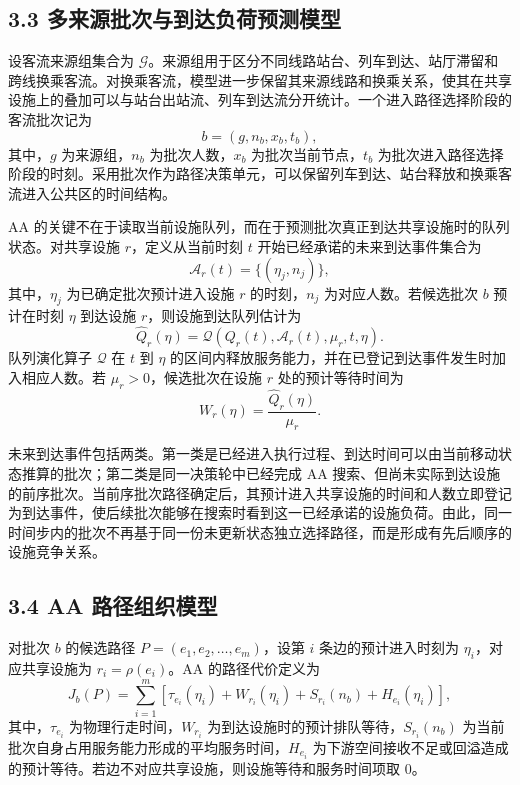 \documentclass[UTF8,a4paper,12pt]{ctexart}
\begin{document}
\subsection{3.3 多来源批次与到达负荷预测模型}

设客流来源组集合为 \(\mathcal{G}\)。来源组用于区分不同线路站台、列车到达、站厅滞留和跨线换乘客流。对换乘客流，模型进一步保留其来源线路和换乘关系，使其在共享设施上的叠加可以与站台出站流、列车到达流分开统计。一个进入路径选择阶段的客流批次记为
\[
b=(g,n_b,x_b,t_b),
\]
其中，\(g\) 为来源组，\(n_b\) 为批次人数，\(x_b\) 为批次当前节点，\(t_b\) 为批次进入路径选择阶段的时刻。采用批次作为路径决策单元，可以保留列车到达、站台释放和换乘客流进入公共区的时间结构。

AA 的关键不在于读取当前设施队列，而在于预测批次真正到达共享设施时的队列状态。对共享设施 \(r\)，定义从当前时刻 \(t\) 开始已经承诺的未来到达事件集合为
\[
\mathcal{A}_r(t)=\{(\eta_j,n_j)\},
\]
其中，\(\eta_j\) 为已确定批次预计进入设施 \(r\) 的时刻，\(n_j\) 为对应人数。若候选批次 \(b\) 预计在时刻 \(\eta\) 到达设施 \(r\)，则设施到达队列估计为
\[
\widehat Q_r(\eta)=\mathcal{Q}\left(Q_r(t),\mathcal{A}_r(t),\mu_r,t,\eta\right).
\]
队列演化算子 \(\mathcal{Q}\) 在 \(t\) 到 \(\eta\) 的区间内释放服务能力，并在已登记到达事件发生时加入相应人数。若 \(\mu_r>0\)，候选批次在设施 \(r\) 处的预计等待时间为
\[
W_r(\eta)=\frac{\widehat Q_r(\eta)}{\mu_r}.
\]

未来到达事件包括两类。第一类是已经进入执行过程、到达时间可以由当前移动状态推算的批次；第二类是同一决策轮中已经完成 AA 搜索、但尚未实际到达设施的前序批次。当前序批次路径确定后，其预计进入共享设施的时间和人数立即登记为到达事件，使后续批次能够在搜索时看到这一已经承诺的设施负荷。由此，同一时间步内的批次不再基于同一份未更新状态独立选择路径，而是形成有先后顺序的设施竞争关系。

\subsection{3.4 AA 路径组织模型}

对批次 \(b\) 的候选路径 \(P=(e_1,e_2,\ldots,e_m)\)，设第 \(i\) 条边的预计进入时刻为 \(\eta_i\)，对应共享设施为 \(r_i=\rho(e_i)\)。AA 的路径代价定义为
\[
J_b(P)=\sum_{i=1}^{m}\left[\tau_{e_i}(\eta_i)+W_{r_i}(\eta_i)+S_{r_i}(n_b)+H_{e_i}(\eta_i)\right],
\]
其中，\(\tau_{e_i}\) 为物理行走时间，\(W_{r_i}\) 为到达设施时的预计排队等待，\(S_{r_i}(n_b)\) 为当前批次自身占用服务能力形成的平均服务时间，\(H_{e_i}\) 为下游空间接收不足或回溢造成的预计等待。若边不对应共享设施，则设施等待和服务时间项取 0。
\end{document}
